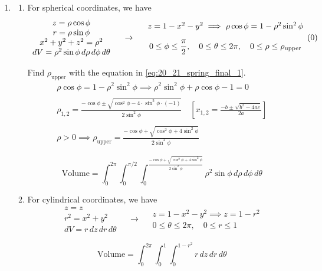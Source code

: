 \documentclass[a4paper, 12pt]{article}
\begin{document}
\begin{enumerate}[leftmargin=*,label=\textbf{\arabic*.}]
\newpage

\item \begin{enumerate}[leftmargin=*,label=\textbf{\alph*.}]
\item For spherical coordinates, we have
\label{eq:20_21_spring_final_1}
\[
\begin{array}{c}
z=\rho\cos\phi\\
r=\rho\sin\phi\\
x^2+y^2+z^2=\rho^2\\
dV=\rho^2\sin\phi\,d\rho\,d\phi\,d\theta
\end{array}
\quad\rightarrow\quad
\begin{array}{cc}
z=1-x^2-y^2
\implies
\rho\cos\phi=1-\rho^2\sin^2\phi
\\[1em]
\displaystyle
0\leq\phi\leq\frac{\pi}{2},
\quad
0\leq\theta\leq2\pi,
\quad
0\leq\rho\leq\rho_{\text{upper}}
\end{array}
\hfill
\vcenter{\hbox{(\theequation)}}
\]

Find $\rho_{\text{upper}}$ with the equation in \eqref{eq:20_21_spring_final_1}.
\[
\begin{array}{c}
\rho\cos\phi=1-\rho^2\sin^2\phi\implies \rho^2\sin^2\phi+\rho\cos\phi-1=0\\\\
\displaystyle \rho_{1,2} = \frac{-\cos\phi \pm\sqrt{\cos^2\phi-4\cdot\sin^2\phi\cdot(-1)}}{2\sin^2\phi}\quad\left[x_{1,2}=\frac{-b\pm\sqrt{b^2-4ac}}{2a}\right]\\\\
\displaystyle \rho>0\implies\rho_{\text{upper}}=\frac{-\cos\phi +\sqrt{\cos^2\phi+4\sin^2\phi}}{2\sin^2\phi}
\end{array}
\]

\[\boxed{\text{Volume}=\int_0^{2\pi}\int_0^{\pi/2}\int_0^{\textstyle\frac{-\cos\phi +\sqrt{\cos^2\phi+4\sin^2\phi}}{2\sin^2\phi}}\rho^2\sin\phi\,d\rho\,d\phi\,d\theta}\]

\item For cylindrical coordinates, we have
\[
\begin{array}{c}
z=z\\
r^2=x^2+y^2\\
dV=r\,dz\,dr\,d\theta
\end{array}\quad\rightarrow\quad
\begin{array}{c}
z=1-x^2-y^2\implies z=1-r^2\\
0\leq\theta\leq2\pi,\quad 0\leq r \leq1
\end{array}
\]

\[\boxed{\text{Volume}=\int_0^{2\pi}\int_0^1\int_0^{1-r^2}r\,dz\,dr\,d\theta}\]
\end{enumerate}
\end{enumerate}
\end{document}
